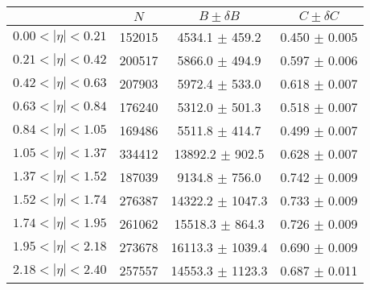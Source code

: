 \begin{tabular}{lccc}
\hline
    &   $N$   & $B \pm \delta B$  &  $C \pm \delta C$ \\
\hline
$0.00 < |\eta| <0.21$          & 152015     & 4534.1     $\pm$ 459.2 & 0.450      $\pm$ 0.005 \\
$0.21 < |\eta| <0.42$          & 200517     & 5866.0     $\pm$ 494.9 & 0.597      $\pm$ 0.006 \\
$0.42 < |\eta| <0.63$          & 207903     & 5972.4     $\pm$ 533.0 & 0.618      $\pm$ 0.007 \\
$0.63 < |\eta| <0.84$          & 176240     & 5312.0     $\pm$ 501.3 & 0.518      $\pm$ 0.007 \\
$0.84 < |\eta| <1.05$          & 169486     & 5511.8     $\pm$ 414.7 & 0.499      $\pm$ 0.007 \\
$1.05 < |\eta| <1.37$          & 334412     & 13892.2    $\pm$ 902.5 & 0.628      $\pm$ 0.007 \\
$1.37 < |\eta| <1.52$          & 187039     & 9134.8     $\pm$ 756.0 & 0.742      $\pm$ 0.009 \\
$1.52 < |\eta| <1.74$          & 276387     & 14322.2    $\pm$ 1047.3 & 0.733      $\pm$ 0.009 \\
$1.74 < |\eta| <1.95$          & 261062     & 15518.3    $\pm$ 864.3 & 0.726      $\pm$ 0.009 \\
$1.95 < |\eta| <2.18$          & 273678     & 16113.3    $\pm$ 1039.4 & 0.690      $\pm$ 0.009 \\
$2.18 < |\eta| <2.40$          & 257557     & 14553.3    $\pm$ 1123.3 & 0.687      $\pm$ 0.011 \\
\hline
\end{tabular}
